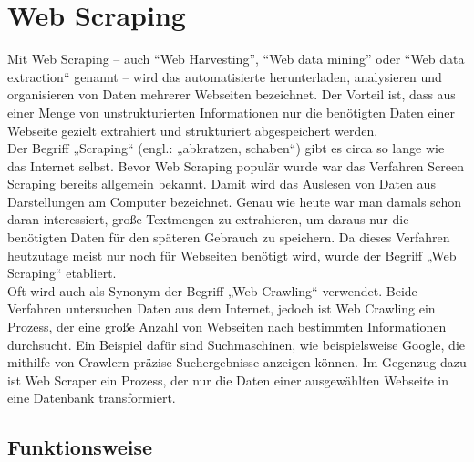 \documentclass[a4paper,oneside,12pt]{report}
\begin{document}
			
		\section{Web Scraping}
		
			Mit Web Scraping – auch “Web Harvesting”, “Web data mining” oder “Web data extraction“ genannt – wird das automatisierte herunterladen, analysieren und organisieren von Daten mehrerer Webseiten bezeichnet. Der Vorteil ist, dass aus einer Menge von unstrukturierten Informationen nur die benötigten Daten einer Webseite gezielt extrahiert und strukturiert abgespeichert werden. \cite{bib-webscraping}
			\\			
			Der Begriff „Scraping“ (engl.: „abkratzen, schaben“) gibt es circa so lange wie das Internet selbst. Bevor Web Scraping populär wurde war das Verfahren Screen Scraping bereits allgemein bekannt. Damit wird das Auslesen von Daten aus Darstellungen am Computer bezeichnet. Genau wie heute war man damals schon daran interessiert, große Textmengen zu extrahieren, um daraus nur die benötigten Daten für den späteren Gebrauch zu speichern. Da dieses Verfahren heutzutage meist nur noch für Webseiten benötigt wird, wurde der Begriff „Web Scraping“ etabliert. \cite{bib-webscraping}
			\\
			Oft wird auch als Synonym der Begriff „Web Crawling“ verwendet. Beide Verfahren untersuchen Daten aus dem Internet, jedoch ist Web Crawling ein Prozess, der eine große Anzahl von Webseiten nach bestimmten Informationen durchsucht. Ein Beispiel dafür sind Suchmaschinen, wie beispielsweise Google, die mithilfe von Crawlern präzise Suchergebnisse anzeigen können. Im Gegenzug dazu ist Web Scraper ein Prozess, der nur die Daten einer ausgewählten Webseite in eine Datenbank transformiert. \cite{bib-webcrawling}
			
			
			\subsection{Funktionsweise}
			
\end{document}
